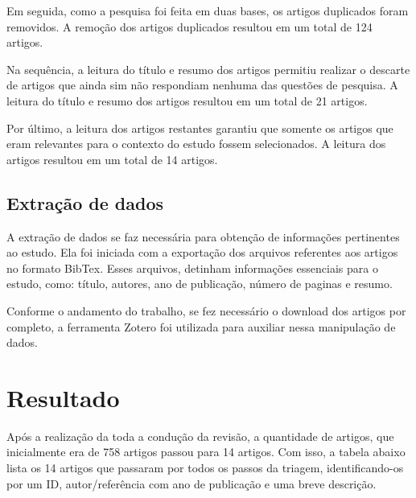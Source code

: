 Em seguida, como a pesquisa foi feita em duas bases, os artigos duplicados foram removidos. A remoção dos artigos duplicados resultou em um total de 124 artigos.

Na sequência, a leitura do título e resumo dos artigos permitiu realizar o descarte de artigos que ainda sim não respondiam nenhuma das questões de pesquisa. A leitura do título e resumo dos artigos resultou em um total de 21 artigos.

Por último, a leitura dos artigos restantes garantiu que somente os artigos que eram relevantes para o contexto do estudo fossem selecionados. A leitura dos artigos resultou em um total de 14 artigos.

\subsection{Extração de dados}

A extração de dados se faz necessária para obtenção de informações pertinentes ao estudo. Ela foi iniciada com a exportação dos arquivos referentes aos artigos no formato BibTex. Esses arquivos, detinham informações essenciais para o estudo, como: título, autores, ano de publicação, número de paginas e resumo.

Conforme o andamento do trabalho, se fez necessário o download dos artigos por completo, a ferramenta Zotero foi utilizada para auxiliar nessa manipulação de dados.

\section{Resultado}

Após a realização da toda a condução da revisão, a quantidade de artigos, que inicialmente era de 758 artigos passou para 14 artigos. Com isso, a tabela abaixo lista os 14 artigos que passaram por todos os passos da triagem, identificando-os por um ID, autor/referência com ano de publicação e uma breve descrição. 

